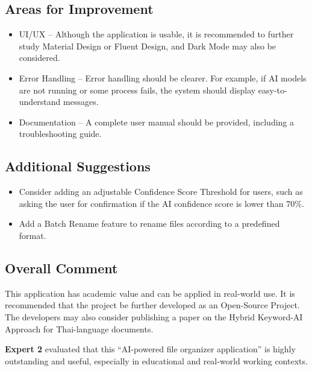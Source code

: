 \documentclass[12pt,oneside,openright,a4paper]{cpe-english-project}
\begin{document}
\subsection*{Areas for Improvement}
\begin{itemize}
\item UI/UX -- Although the application is usable, it is recommended to further study Material Design or Fluent Design, and Dark Mode may also be considered.
\item Error Handling -- Error handling should be clearer. For example, if AI models are not running or some process fails, the system should display easy-to-understand messages.
\item Documentation -- A complete user manual should be provided, including a troubleshooting guide.
\end{itemize}
\subsection*{Additional Suggestions}
\begin{itemize}
\item Consider adding an adjustable Confidence Score Threshold for users, such as asking the user for confirmation if the AI confidence score is lower than 70\%.
\item Add a Batch Rename feature to rename files according to a predefined format.
\end{itemize}
\subsection*{Overall Comment}
This application has academic value and can be applied in real-world use. It is recommended that the project be further developed as an Open-Source Project. The developers may also consider publishing a paper on the Hybrid Keyword-AI Approach for Thai-language documents.

\bigskip
\noindent\textbf{Expert 2} evaluated that this ``AI-powered file organizer application'' is highly outstanding and useful, especially in educational and real-world working contexts.
\end{document}
